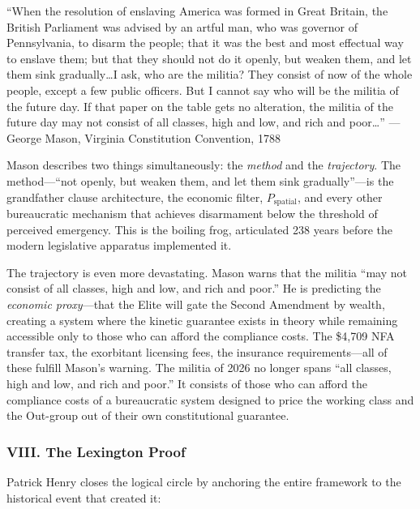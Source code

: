\begin{historicalsource}
``When the resolution of enslaving America was formed in Great Britain, the British Parliament was advised by an artful man, who was governor of Pennsylvania, to disarm the people; that it was the best and most effectual way to enslave them; but that they should not do it openly, but weaken them, and let them sink gradually\ldots I ask, who are the militia? They consist of now of the whole people, except a few public officers. But I cannot say who will be the militia of the future day. If that paper on the table gets no alteration, the militia of the future day may not consist of all classes, high and low, and rich and poor\ldots'' \hfill ---George Mason, Virginia Constitution Convention, 1788
\end{historicalsource}

Mason describes two things simultaneously: the \textit{method} and the \textit{trajectory}. The method---``not openly, but weaken them, and let them sink gradually''---is the grandfather clause architecture, the economic filter, $P_{\text{spatial}}$, and every other bureaucratic mechanism that achieves disarmament below the threshold of perceived emergency. This is the boiling frog, articulated 238 years before the modern legislative apparatus implemented it.

The trajectory is even more devastating. Mason warns that the militia ``may not consist of all classes, high and low, and rich and poor.'' He is predicting the \textit{economic proxy}---that the Elite will gate the Second Amendment by wealth, creating a system where the kinetic guarantee exists in theory while remaining accessible only to those who can afford the compliance costs. The \$4,709 NFA transfer tax, the exorbitant licensing fees, the insurance requirements---all of these fulfill Mason's warning. The militia of 2026 no longer spans ``all classes, high and low, and rich and poor.'' It consists of those who can afford the compliance costs of a bureaucratic system designed to price the working class and the Out-group out of their own constitutional guarantee.

\subsubsection*{VIII. The Lexington Proof}

Patrick Henry closes the logical circle by anchoring the entire framework to the historical event that created it:

